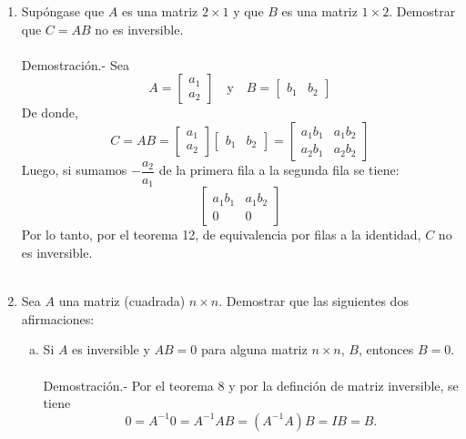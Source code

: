 \begin{enumerate}[\bfseries 1.]
    \item Supóngase que $A$ es una matriz $2\times 1$ y que $B$ es una matriz $1\times 2$. Demostrar que $C=AB$ no es inversible.\\\\
	Demostración.-\; Sea 
	$$
	A=
	\left[
	    \begin{array}{r}
		a_1\\
		a_2
	    \end{array}
	\right]
	\quad \mbox{y}\quad 
	B=
	\left[
	    \begin{array}{rr}
		b_1 & b_2
	    \end{array}
	\right]
	$$
	De donde,
	$$
	C=AB=
	\left[
	    \begin{array}{r}
		a_1\\
		a_2
	    \end{array}
	\right]
	\left[
	    \begin{array}{rr}
		b_1 & b_2
	    \end{array}
	\right]
	=
	\left[
	    \begin{array}{rr}
		a_1b_1 & a_1b_2\\
		a_2b_1 & a_2b_2
	    \end{array}
	\right]
	$$
	Luego, si sumamos $-\dfrac{a_2}{a_1}$ de la primera fila a la segunda fila se tiene:
	$$
	\left[
	    \begin{array}{rr}
		a_1b_1 & a_1b_2\\
		0 & 0
	    \end{array}
	\right]
	$$
	Por lo tanto, por el teorema 12, de equivalencia por filas a la identidad, $C$ no es inversible.\\\\

    \item Sea $A$ una matriz (cuadrada) $n\times n$. Demostrar que las siguientes dos afirmaciones:

	\begin{enumerate}[(a)]

	    \item Si $A$ es inversible y $AB=0$ para alguna matriz $n\times n$, $B$, entonces $B=0$.\\\\
		Demostración.-\; Por el teorema 8 y por la definción de matriz inversible, se tiene
		$$0=A^{-1}0=A^{-1}AB=\left(A^{-1}A\right)B=IB=B.$$\\


\end{enumerate}
\end{enumerate}
